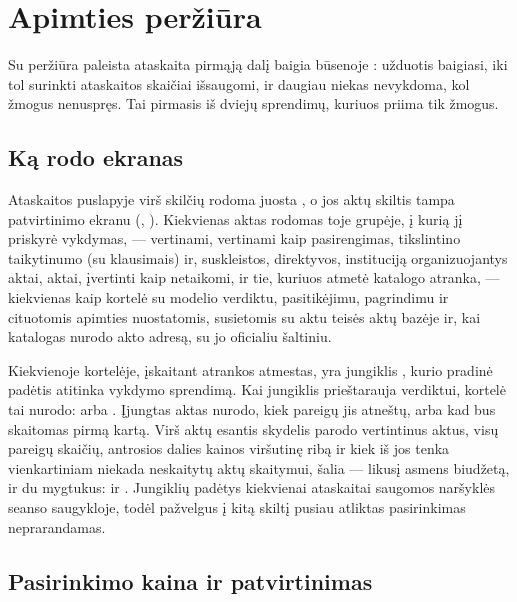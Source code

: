 \section{Apimties peržiūra}\label{sec:report:scope}

Su peržiūra paleista ataskaita pirmąją dalį baigia būsenoje : užduotis
baigiasi, iki tol surinkti ataskaitos skaičiai išsaugomi, ir daugiau niekas nevykdoma, kol
žmogus nenuspręs. Tai pirmasis iš dviejų sprendimų, kuriuos priima tik žmogus.

\subsection{Ką rodo ekranas}

Ataskaitos puslapyje virš skilčių rodoma juosta , o jos
aktų skiltis tampa patvirtinimo ekranu (,
). Kiekvienas aktas rodomas toje grupėje, į kurią jį
priskyrė vykdymas, --- vertinami, vertinami kaip pasirengimas, tikslintino taikytinumo (su
klausimais) ir, suskleistos, direktyvos, instituciją organizuojantys aktai, aktai, įvertinti
kaip netaikomi, ir tie, kuriuos atmetė katalogo atranka, --- kiekvienas kaip kortelė su modelio
verdiktu, pasitikėjimu, pagrindimu ir cituotomis apimties nuostatomis, susietomis su aktu
teisės aktų bazėje ir, kai katalogas nurodo akto adresą, su jo oficialiu
šaltiniu.

Kiekvienoje kortelėje, įskaitant atrankos atmestas, yra jungiklis , kurio pradinė
padėtis atitinka vykdymo sprendimą. Kai jungiklis prieštarauja verdiktui, kortelė tai nurodo:
 arba . Įjungtas aktas nurodo, kiek pareigų jis atneštų, arba
kad bus skaitomas pirmą kartą. Virš aktų esantis skydelis 
parodo vertintinus aktus, visų pareigų skaičių, antrosios dalies kainos viršutinę ribą ir kiek
iš jos tenka vienkartiniam niekada neskaitytų aktų skaitymui, šalia --- likusį asmens biudžetą,
ir du mygtukus:  ir . Jungiklių padėtys kiekvienai
ataskaitai saugomos naršyklės seanso saugykloje, todėl pažvelgus į kitą skiltį pusiau atliktas
pasirinkimas neprarandamas.

\subsection{Pasirinkimo kaina ir patvirtinimas}

